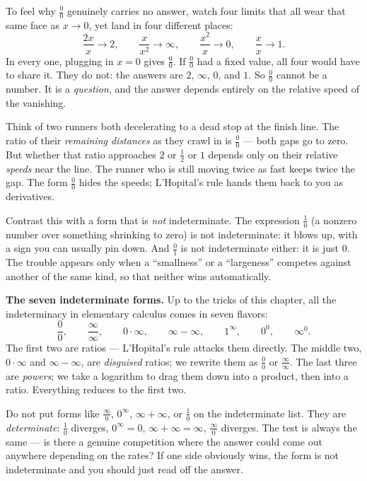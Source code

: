To feel why $\tfrac{0}{0}$ genuinely carries no answer, watch four limits that all
wear that same face as $x\to 0$, yet land in four different places:
\[
\frac{2x}{x}\to 2,\qquad
\frac{x}{x^2}\to \infty,\qquad
\frac{x^2}{x}\to 0,\qquad
\frac{x}{x}\to 1.
\]
In every one, plugging in $x=0$ gives $\tfrac{0}{0}$. If $\tfrac{0}{0}$ had a fixed
value, all four would have to share it. They do not: the answers are $2$, $\infty$,
$0$, and $1$. So $\tfrac{0}{0}$ cannot be a number. It is a \emph{question}, and the
answer depends entirely on the relative speed of the vanishing.

\begin{intuitionbox}
Think of two runners both decelerating to a dead stop at the finish line. The ratio
of their \emph{remaining distances} as they crawl in is $\tfrac{0}{0}$ --- both gaps
go to zero. But whether that ratio approaches $2$ or $\tfrac12$ or $1$ depends only on
their relative \emph{speeds} near the line. The runner who is still moving twice as
fast keeps twice the gap. The form $\tfrac{0}{0}$ hides the speeds; L'Hopital's rule
hands them back to you as derivatives.
\end{intuitionbox}

Contrast this with a form that is \emph{not} indeterminate. The expression
$\tfrac{1}{0}$ (a nonzero number over something shrinking to zero) is not
indeterminate: it blows up, with a sign you can usually pin down. And $\tfrac{0}{1}$
is not indeterminate either: it is just $0$. The trouble appears only when a
``smallness'' or a ``largeness'' competes against another of the same kind, so that
neither wins automatically.

\begin{focusbox}
\textbf{The seven indeterminate forms.} Up to the tricks of this chapter, all the
indeterminacy in elementary calculus comes in seven flavors:
\[
\frac{0}{0},\qquad \frac{\infty}{\infty},\qquad 0\cdot\infty,\qquad
\infty-\infty,\qquad 1^{\infty},\qquad 0^{0},\qquad \infty^{0}.
\]
The first two are ratios --- L'Hopital's rule attacks them directly. The middle two,
$0\cdot\infty$ and $\infty-\infty$, are \emph{disguised} ratios; we rewrite them as
$\tfrac{0}{0}$ or $\tfrac{\infty}{\infty}$. The last three are \emph{powers}; we take a
logarithm to drag them down into a product, then into a ratio. Everything reduces to
the first two.
\end{focusbox}

\begin{trapbox}
Do not put forms like $\tfrac{\infty}{0}$, $0^{\infty}$, $\infty+\infty$, or
$\tfrac{1}{0}$ on the indeterminate list. They are \emph{determinate}: $\tfrac{1}{0}$
diverges, $0^{\infty}=0$, $\infty+\infty=\infty$, $\tfrac{\infty}{0}$ diverges. The
test is always the same --- is there a genuine competition where the answer could come
out anywhere depending on the rates? If one side obviously wins, the form is not
indeterminate and you should just read off the answer.
\end{trapbox}


